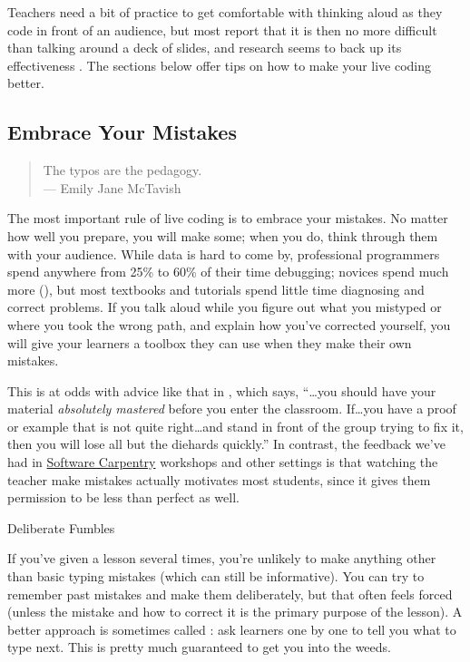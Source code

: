 Teachers need a bit of practice to get comfortable with thinking aloud
as they code in front of an audience, but most report that it is then
no more difficult than talking around a deck of slides, and research
seems to back up its effectiveness \cite{Rubi2013,Haar2017}.  The
sections below offer tips on how to make your live coding better.

\subsection*{Embrace Your Mistakes}

\begin{quote}

  The typos are the pedagogy.\\
  --- Emily Jane McTavish

\end{quote}

The most important rule of live coding is to embrace your mistakes.
No matter how well you prepare, you will make some; when you do, think
through them with your audience.  While data is hard to come by,
professional programmers spend anywhere from 25\% to 60\% of their
time debugging; novices spend much more (), but
most textbooks and tutorials spend little time diagnosing and correct
problems.  If you talk aloud while you figure out what you mistyped or
where you took the wrong path, and explain how you've corrected
yourself, you will give your learners a toolbox they can use when they
make their own mistakes.

This is at odds with advice like that in \cite{Kran2015}, which says,
``{\ldots}you should have your material \emph{absolutely mastered}
before you enter the classroom. If{\ldots}you have a proof or example
that is not quite right{\ldots}and stand in front of the group trying
to fix it, then you will lose all but the diehards quickly.''  In
contrast, the feedback we've had in
\href{http://software-carpentry.org}{Software Carpentry} workshops and
other settings is that watching the teacher make mistakes actually
motivates most students, since it gives them permission to be less
than perfect as well.

\begin{callout}{Deliberate Fumbles}

  If you've given a lesson several times, you're unlikely to make
  anything other than basic typing mistakes (which can still be
  informative). You can try to remember past mistakes and make them
  deliberately, but that often feels forced (unless the mistake and
  how to correct it is the primary purpose of the lesson).  A better
  approach is sometimes called : ask learners one by one to tell you what to type next.
  This is pretty much guaranteed to get you into the weeds.

\end{callout}

